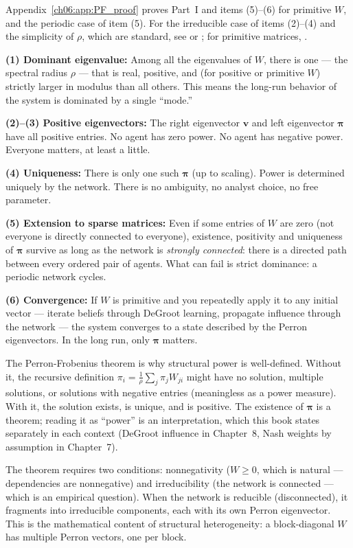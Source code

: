 \documentclass[../structural_economics_book.tex]{subfiles}
\begin{document}
Appendix~\ref{ch06:app:PF_proof} proves Part~I and items (5)--(6) for primitive $W$, and the periodic case of item (5). For the irreducible case of items (2)--(4) and the simplicity of $\rho$, which are standard, see \citet[Thm.~1.5]{seneta2006nonnegative} or \citet[Thm.~8.4.4]{horn2012matrix}; for primitive matrices, \citet[Thms.~1.1--1.2]{seneta2006nonnegative}.

\begin{intuition}
\textbf{(1) Dominant eigenvalue:} Among all the eigenvalues of $W$, there is one --- the spectral radius $\rho$ --- that is real, positive, and (for positive or primitive $W$) strictly larger in modulus than all others. This means the long-run behavior of the system is dominated by a single ``mode.''

\textbf{(2)--(3) Positive eigenvectors:} The right eigenvector $\mathbf{v}$ and left eigenvector $\boldsymbol{\pi}$ have all positive entries. No agent has zero power. No agent has negative power. Everyone matters, at least a little.

\textbf{(4) Uniqueness:} There is only one such $\boldsymbol{\pi}$ (up to scaling). Power is determined uniquely by the network. There is no ambiguity, no analyst choice, no free parameter.

\textbf{(5) Extension to sparse matrices:} Even if some entries of $W$ are zero (not everyone is directly connected to everyone), existence, positivity and uniqueness of $\boldsymbol{\pi}$ survive as long as the network is \textit{strongly connected}: there is a directed path between every ordered pair of agents. What can fail is strict dominance: a periodic network cycles.

\textbf{(6) Convergence:} If $W$ is primitive and you repeatedly apply it to any initial vector --- iterate beliefs through DeGroot learning, propagate influence through the network --- the system converges to a state described by the Perron eigenvectors. In the long run, only $\boldsymbol{\pi}$ matters.
\end{intuition}

\begin{keyinsight}
The Perron-Frobenius theorem is why structural power is well-defined. Without it, the recursive definition $\pi_i = \frac{1}{\rho}\sum_j \pi_j W_{ji}$ might have no solution, multiple solutions, or solutions with negative entries (meaningless as a power measure). With it, the solution exists, is unique, and is positive. The existence of $\boldsymbol{\pi}$ is a theorem; reading it as ``power'' is an interpretation, which this book states separately in each context (DeGroot influence in Chapter~8, Nash weights by assumption in Chapter~7).

The theorem requires two conditions: nonnegativity ($W \geq 0$, which is natural --- dependencies are nonnegative) and irreducibility (the network is connected --- which is an empirical question). When the network is reducible (disconnected), it fragments into irreducible components, each with its own Perron eigenvector. This is the mathematical content of structural heterogeneity: a block-diagonal $W$ has multiple Perron vectors, one per block.
\end{keyinsight}
\end{document}

